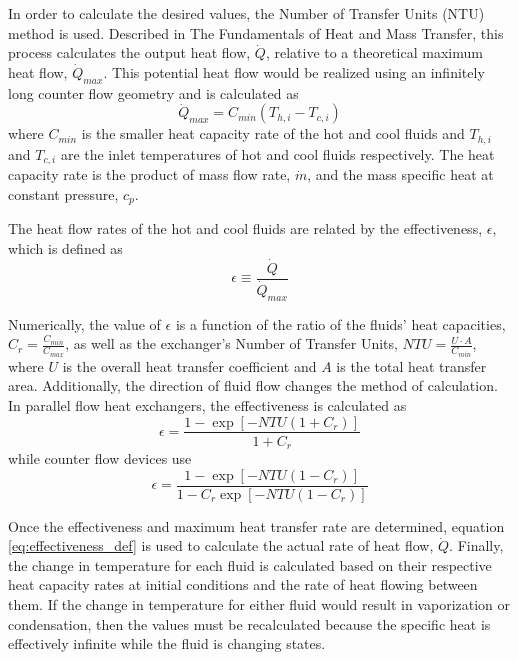 In order to calculate the desired values, the Number of Transfer Units (NTU) method is used. Described in The Fundamentals of Heat and Mass Transfer, \cite{Incropera} this process calculates the output heat flow, $\dot{Q}$, relative to a theoretical maximum heat flow, $\dot{Q}_{max}$. This potential heat flow would be realized using an infinitely long counter flow geometry and is calculated as
\begin{equation}
\dot{Q}_{max} = C_{min}\left(T_{h,i} - T_{c,i}\right)
\end{equation}
where $C_{min}$ is the smaller heat capacity rate of the hot and cool fluids and $T_{h,i}$ and $T_{c,i}$ are the inlet temperatures of hot and cool fluids respectively. The heat capacity rate is the product of mass flow rate, $ \dot{m} $, and the mass specific heat at constant pressure, $ c_p $. 

The heat flow rates of the hot and cool fluids are related by the effectiveness, $\epsilon$, which is defined as 
\begin{equation}
\label{eq:effectiveness_def}
\epsilon \equiv \frac{\dot{Q}}{\dot{Q}_{max}}
\end{equation}

Numerically, the value of $\epsilon$ is a function of the ratio of the fluids' heat capacities, $C_r = \frac{C_{min}}{C_{max}}$, as well as the exchanger's Number of Transfer Units, $NTU = \frac{U \cdot A}{C_{min}}$, where $U$ is the overall heat transfer coefficient and $A$ is the total heat transfer area. Additionally, the direction of fluid flow changes the method of calculation. In parallel flow heat exchangers, the effectiveness is calculated as
\begin{equation}
\epsilon = \frac{1 - \exp\left[-NTU\left(1 + C_r\right)\right]}{1 + C_r}
\end{equation}
while counter flow devices use
\begin{equation}
\epsilon = \frac{1 - \exp\left[-NTU\left(1 - C_r\right)\right]}{1 - C_r\exp\left[-NTU\left(1 - C_r\right)\right]}
\end{equation}

Once the effectiveness and maximum heat transfer rate are determined, equation \ref{eq:effectiveness_def} is used to calculate the actual rate of heat flow, $\dot{Q}$. Finally, the change in temperature for each fluid is calculated based on their respective heat capacity rates at initial conditions and the rate of heat flowing between them. 
If the change in temperature for either fluid would result in vaporization or condensation, then the values must be recalculated because the specific heat is effectively infinite while the fluid is changing states. 

